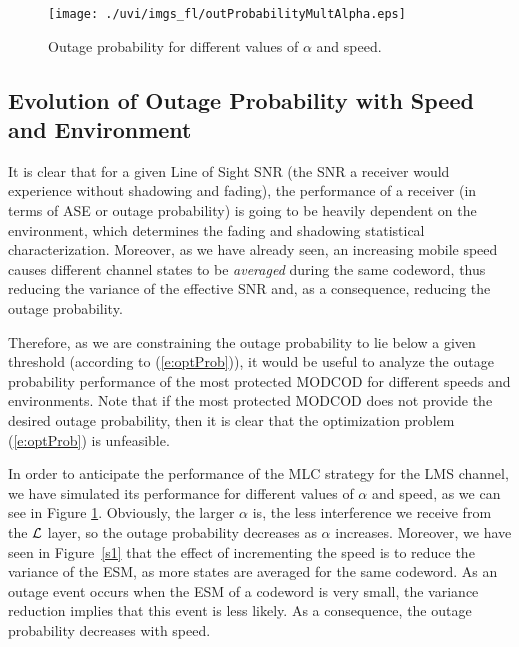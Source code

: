 \documentclass[journal,onecolumn,10pt,a4paper]{IEEEtran}
\begin{document}
\begin{figure}
\begin{center}

 \texttt{[image: ./uvi/imgs\_fl/outProbabilityMultAlpha.eps]}
\caption{Outage probability for different values of $\alpha$ and speed.}

\label{outProbabilityMultAlpha}\end{center}
\end{figure}





\subsection{Evolution of Outage Probability with Speed and Environment}
It is clear that for a given Line of Sight SNR (the SNR a receiver would experience without shadowing and fading), the performance of a receiver (in terms of ASE or outage probability) is going to be heavily dependent on the environment, which determines the fading and shadowing statistical characterization. Moreover, as we have already seen, an increasing mobile speed causes different channel states to be \textit{averaged} during the same codeword, thus reducing the variance of the effective SNR and, as a consequence, reducing the outage probability.

Therefore, as we are constraining the outage probability to lie below a given threshold (according to (\ref{e:optProb})), it would be useful to analyze the outage probability performance of the most protected MODCOD for different speeds and environments. Note that if the most protected MODCOD does not provide the desired outage probability, then it is clear that the optimization problem (\ref{e:optProb}) is unfeasible.

In order to anticipate the performance of the MLC strategy for the LMS channel, we have simulated its performance for different values of $\alpha$ and speed, as we can see in Figure \ref{outProbabilityMultAlpha}. Obviously, the larger $\alpha$ is, the less interference we receive from the ${\cal L}$ layer, so the outage probability decreases as $\alpha$ increases. Moreover, we have seen in Figure~\ref{s1} that the effect of incrementing the speed is to reduce the variance of the ESM, as more states are averaged for the same codeword. As an outage event occurs when the ESM of a codeword is very small, the variance reduction implies that this event is less likely. As a consequence, the outage probability decreases with speed.
\end{document}
